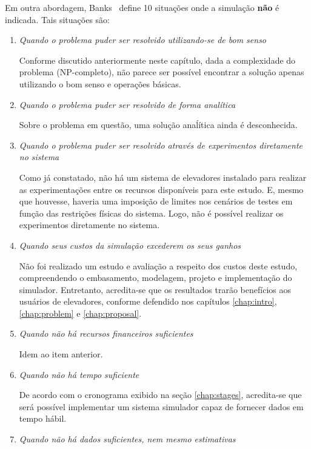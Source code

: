 Em outra abordagem, Banks~\cite{BanksGibson} define 10 situações onde a simulação
\textbf{não} é indicada. Tais situações são:

\begin{enumerate}
\item \textit{Quando o problema puder ser resolvido utilizando-se de bom senso}

Conforme discutido anteriormente neste capítulo, dada a complexidade do problema
(NP-completo), não parece ser possível encontrar a solução apenas utilizando o
bom senso e operações básicas.

\item \textit{Quando o problema puder ser resolvido de forma analítica}

Sobre o problema em questão, uma solução anaĺítica ainda é desconhecida.

\item \textit{Quando o problema puder ser resolvido através de experimentos
diretamente no sistema}

Como já constatado, não há um sistema de elevadores instalado para realizar as
experimentações entre os recursos disponíveis para este estudo. E, mesmo que
houvesse, haveria uma imposição de limites nos cenários de testes em função das
restrições físicas do sistema. Logo, não é possível realizar os experimentos
diretamente no sistema.

\item \textit{Quando seus custos da simulação excederem os seus ganhos}

Não foi realizado um estudo e avaliação a respeito dos custos deste estudo,
compreendendo o embasamento, modelagem, projeto e implementação do simulador.
Entretanto, acredita-se que os resultados trarão benefícios aos usuários de
elevadores, conforme defendido nos capítulos \ref{chap:intro},
\ref{chap:problem} e \ref{chap:proposal}.

\item \textit{Quando não há recursos financeiros suficientes}

Idem ao item anterior.

\item \textit{Quando não há tempo suficiente}

De acordo com o cronograma exibido na seção \ref{chap:stages}, acredita-se que
será possível implementar um sistema simulador capaz de fornecer dados em tempo
hábil.

\item \textit{Quando não há dados suficientes, nem mesmo estimativas}


\end{enumerate}
